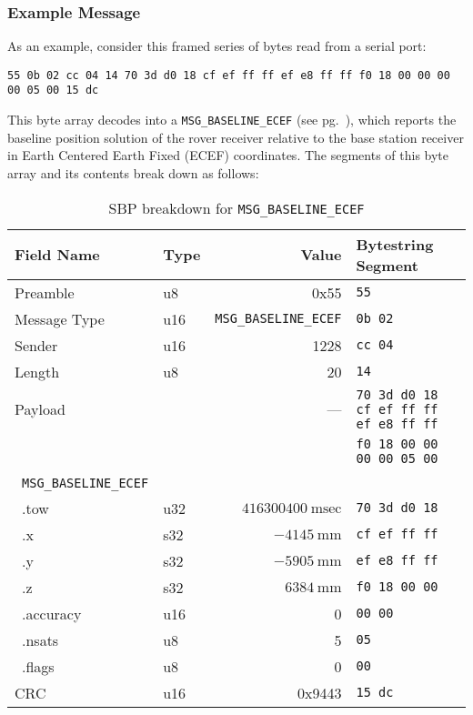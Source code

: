 \documentclass[9pt]{extarticle}
\numberwithin{table}{subsection}
\numberwithin{field}{subsection}
\begin{document}
\subsubsection*{Example Message}
\begin{large}
 \par As an example, consider this framed series of bytes read from a
 serial port:
\begin{verbatim}
55 0b 02 cc 04 14 70 3d d0 18 cf ef ff ff ef e8 ff ff f0 18 00 00 00 00 05 00 15 dc
\end{verbatim}
This byte array decodes into a \texttt{MSG\_BASELINE\_ECEF} (see
pg.~\pageref{sec:MSG_BASELINE_ECEF}), which reports the baseline position
solution of the rover receiver relative to the base station receiver
in Earth Centered Earth Fixed (ECEF) coordinates. The segments of this
byte array and its contents break down as follows:
\end{large}
\begin{table}[h]
  \centering
  \begin{tabular}{llrl}
    \toprule
    Field Name & Type & Value & Bytestring Segment\\
    \midrule
    {Preamble} & u8 & 0x55 & \verb!55! \\
    {Message Type}& u16 & \texttt{MSG\_BASELINE\_ECEF} & \verb!0b 02! \\
    {Sender}& u16 & 1228 & \verb!cc 04! \\
    {Length}& u8 & 20 &  \verb!14! \\
    {Payload}& & --- & \verb!70 3d d0 18 cf ef ff ff ef e8 ff ff! \\
    & & & \verb!f0 18 00 00 00 00 05 00! \\
    \quad~\texttt{MSG\_BASELINE\_ECEF} & & & \\
    \quad~.tow & u32 & $416300400~\textrm{msec}$  & \verb!70 3d d0 18! \\
    \quad~.x & s32 & $-4145~\textrm{mm}$  & \verb!cf ef ff ff! \\
    \quad~.y & s32 & $-5905~\textrm{mm}$  & \verb!ef e8 ff ff! \\
    \quad~.z & s32 & $6384~\textrm{mm}$  & \verb!f0 18 00 00! \\
    \quad~.accuracy & u16 & 0 & \verb!00 00! \\
    \quad~.nsats & u8 & 5 & \verb!05! \\
    \quad~.flags & u8 & 0 & \verb!00! \\
    {CRC} & u16 & 0x9443 & \verb!15 dc! \\
    \bottomrule
  \end{tabular}
  \caption{SBP breakdown for \texttt{MSG\_BASELINE\_ECEF}}
  \label{tab:example_breakdown}
\end{table}
\end{document}
